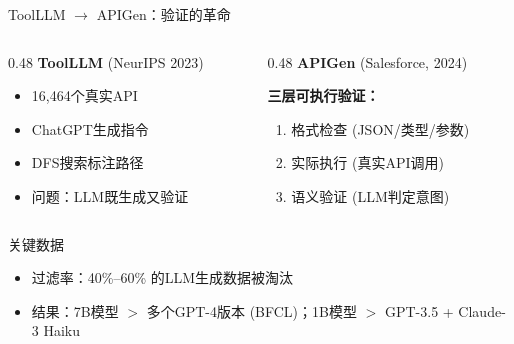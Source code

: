 \documentclass[aspectratio=169, 11pt]{beamer}
\begin{document}
\begin{frame}{ToolLLM $\rightarrow$ APIGen：验证的革命}
\begin{columns}[T]
\begin{column}{0.48\textwidth}
\textbf{ToolLLM} {\scriptsize (NeurIPS 2023)}
\begin{itemize}
    \small
    \item 16,464个真实API
    \item ChatGPT生成指令
    \item DFS搜索标注路径
    \item[\color{accentred}\textbullet] \color{accentred} 问题：LLM既生成又验证
\end{itemize}
\end{column}
\begin{column}{0.48\textwidth}
\textbf{APIGen} {\scriptsize (Salesforce, 2024)}

\textbf{三层可执行验证：}
\begin{enumerate}
    \small
    \item 格式检查 (JSON/类型/参数)
    \item 实际执行 (真实API调用)
    \item 语义验证 (LLM判定意图)
\end{enumerate}
\end{column}
\end{columns}

\vspace{10pt}
\begin{block}{关键数据}
\begin{itemize}
    \item 过滤率：\alert{40\%--60\%} 的LLM生成数据被淘汰
    \item 结果：7B模型 $>$ 多个GPT-4版本 (BFCL)；1B模型 $>$ GPT-3.5 + Claude-3 Haiku
\end{itemize}
\end{block}
\end{frame}
\end{document}
